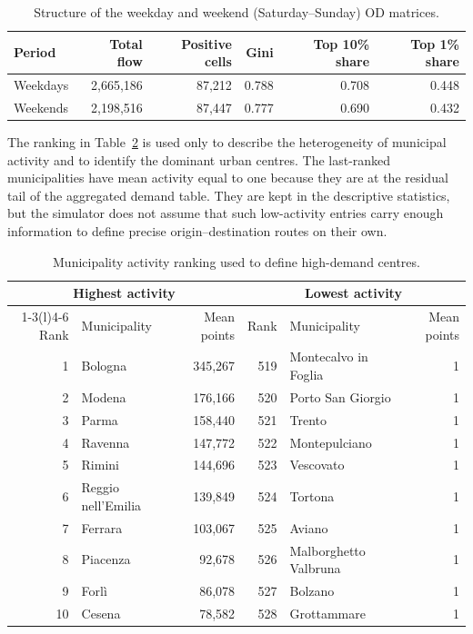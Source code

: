 \documentclass[11pt,a4paper]{article}
\begin{document}
\begin{table}[htbp]
\centering
\caption{Structure of the weekday and weekend (Saturday--Sunday) OD matrices.}
\label{tab:od-structure}
\begin{tabular}{@{}lrrrrr@{}}
\toprule
Period & Total flow & Positive cells & Gini & Top 10\% share & Top 1\% share \\
\midrule
Weekdays & 2,665,186 & 87,212 & 0.788 & 0.708 & 0.448 \\
Weekends & 2,198,516 & 87,447 & 0.777 & 0.690 & 0.432 \\
\bottomrule
\end{tabular}
\end{table}

The ranking in Table~\ref{tab:city-ranking} is used only to describe the heterogeneity of municipal activity and to identify the dominant urban centres. The last-ranked municipalities have mean activity equal to one because they are at the residual tail of the aggregated demand table. They are kept in the descriptive statistics, but the simulator does not assume that such low-activity entries carry enough information to define precise origin--destination routes on their own.

\begin{table}[htbp]
\centering
\caption{Municipality activity ranking used to define high-demand centres.}
\label{tab:city-ranking}
\begin{tabular}{@{}rlr@{\qquad}rlr@{}}
\toprule
\multicolumn{3}{c}{Highest activity} & \multicolumn{3}{c}{Lowest activity} \\
\cmidrule(r){1-3}\cmidrule(l){4-6}
Rank & Municipality & Mean points & Rank & Municipality & Mean points \\
\midrule
1 & Bologna & 345,267 & 519 & Montecalvo in Foglia & 1 \\
2 & Modena & 176,166 & 520 & Porto San Giorgio & 1 \\
3 & Parma & 158,440 & 521 & Trento & 1 \\
4 & Ravenna & 147,772 & 522 & Montepulciano & 1 \\
5 & Rimini & 144,696 & 523 & Vescovato & 1 \\
6 & Reggio nell'Emilia & 139,849 & 524 & Tortona & 1 \\
7 & Ferrara & 103,067 & 525 & Aviano & 1 \\
8 & Piacenza & 92,678 & 526 & Malborghetto Valbruna & 1 \\
9 & Forl\`i & 86,078 & 527 & Bolzano & 1 \\
10 & Cesena & 78,582 & 528 & Grottammare & 1 \\
\bottomrule
\end{tabular}
\end{table}
\end{document}
